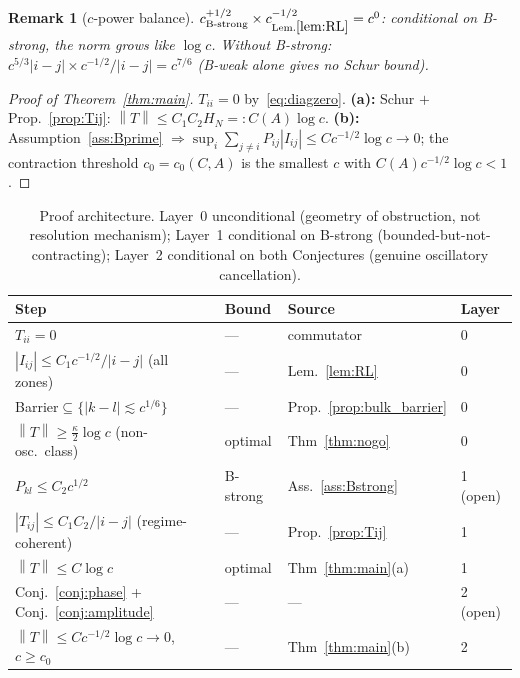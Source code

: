 \documentclass[12pt,a4paper]{article}
\newtheorem{remark}[theorem]{Remark}
\newcommand{\norm}[1]{\left\|#1\right\|}
\begin{document}
\begin{remark}[$c$-power balance]\label{rem:balance}
$c^{+1/2}_{\rm B\text{-}strong}\times c^{-1/2}_{\rm Lem.\ref{lem:RL}}
=c^0$: conditional on B-strong, the norm grows like $\log c$.
Without B-strong: $c^{5/3}|i-j|\times c^{-1/2}/|i-j|=c^{7/6}$
(B-weak alone gives no Schur bound).
\end{remark}

\begin{proof}[Proof of Theorem~\ref{thm:main}]
$T_{ii}=0$ by~\eqref{eq:diagzero}.
\textbf{(a):} Schur $+$ Prop.~\ref{prop:Tij}:
$\norm{T}\leq C_1C_2H_N=:C(A)\log c$.
\textbf{(b):} Assumption~\ref{ass:Bprime}
$\Rightarrow\sup_i\sum_{j\neq i}P_{ij}|I_{ij}|
\leq Cc^{-1/2}\log c\to0$;
the contraction threshold $c_0=c_0(C,A)$ is the smallest
$c$ with $C(A)c^{-1/2}\log c<1$.
\end{proof}

\begin{table}[h]
\centering\renewcommand{\arraystretch}{1.3}
\begin{tabular}{llll}
\hline
\textbf{Step}&\textbf{Bound}&\textbf{Source}&\textbf{Layer}\\
\hline
$T_{ii}=0$&---&commutator&0\\
$|I_{ij}|\leq C_1c^{-1/2}/|i-j|$ (all zones)&---&Lem.~\ref{lem:RL}&0\\
Barrier$\subseteq\{|k-l|\lesssim c^{1/6}\}$&---
  &Prop.~\ref{prop:bulk_barrier}&0\\
$\norm{T}\geq\tfrac{\kappa}{2}\log c$ (non-osc.\ class)&optimal
  &Thm~\ref{thm:nogo}&0\\
\hline
$P_{kl}\leq C_2c^{1/2}$&B-strong&Ass.~\ref{ass:Bstrong}&1 (open)\\
$|T_{ij}|\leq C_1C_2/|i-j|$ (regime-coherent)&---&Prop.~\ref{prop:Tij}&1\\
$\norm{T}\leq C\log c$&optimal&Thm~\ref{thm:main}(a)&1\\
\hline
Conj.~\ref{conj:phase} + Conj.~\ref{conj:amplitude}&---&---&2 (open)\\
$\norm{T}\leq Cc^{-1/2}\log c\to0$, $c\geq c_0$&---&Thm~\ref{thm:main}(b)&2\\
\hline
\end{tabular}
\caption{Proof architecture. Layer~0 unconditional (geometry of obstruction,
not resolution mechanism);
Layer~1 conditional on B-strong (bounded-but-not-contracting);
Layer~2 conditional on both Conjectures (genuine oscillatory cancellation).}
\label{tab:mechanisms}
\end{table}
\end{document}
